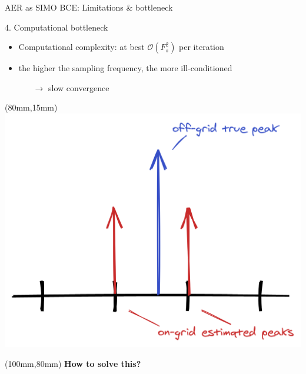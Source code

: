 \begin{frame}{AER as SIMO BCE: Limitations \& bottleneck}
\begin{block}{4. Computational bottleneck}
\begin{itemize}
        \item Computational complexity: at best $\mathcal{O}(F_s^2)$ per iteration

        \item the higher the sampling frequency, the more ill-conditioned \\
        \begin{itemize}
            \item[$\longrightarrow$] slow convergence
        \end{itemize}
        \end{itemize}

    \end{block}

    \begin{textblock*}{40mm}(80mm,15mm)
        \includegraphics[width=\columnwidth]{figures/bodyguard.png}
    \end{textblock*}

    \begin{textblock*}{40mm}(100mm,80mm)
        \textcolor{myred}{\textbf{How to solve this?}}
    \end{textblock*}

\end{frame}


